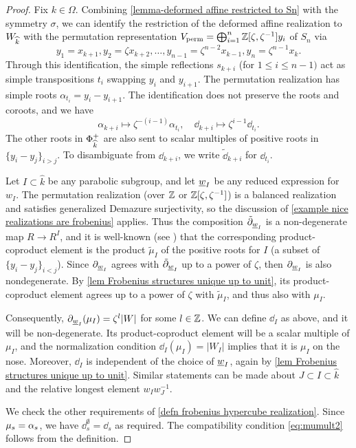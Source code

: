\begin{proof} 
Fix $k \in \Omega$. Combining \cref{lemma-deformed affine restricted to Sn} with the symmetry $\sigma$, we can identify the restriction of the deformed affine realization to $W_{\widehat{k}}$ with the permutation representation  $V_{\operatorname{perm}}=\bigoplus_{i=1}^n \mathbb{Z}[\zeta,\zeta^{-1}] y_i$ of $S_n$ via 
\begin{equation}\label{eq identifying deformed affine restricted to W-k-hat with permutation}
y_1=x_{k+1}, y_2=\zeta x_{k+2}, \ldots ,y_{n-1}=\zeta^{n-2} x_{k-1}, y_n=\zeta^{n-1} x_k.     
\end{equation}
Through this identification, the simple reflections $s_{k+i}$ (for $1 \leq i \leq n-1)$ act as simple transpositions $t_i$ swapping $y_i$ and $y_{i+1}$.
The permutation realization has simple roots $\alpha_{t_i} = y_i-y_{i+1}$. The identification does not preserve the roots and coroots, and we have
\begin{equation} \alpha_{k+i} \mapsto \zeta^{-(i-1)} \alpha_{t_i}, \quad \dd_{k+i} \mapsto \zeta^{i-1} \dd_{t_i}. \end{equation}
The other roots in $\Phi^+_{\widehat{k}}$ are also sent to scalar multiples of positive roots in $\{y_i - y_j\}_{i > j}$. To disambiguate from $\dd_{k+i}$, we write $\tilde{\dd}_{k+i}$ for $\dd_{t_i}$.

Let $I \subset \hat{k}$ be any parabolic subgroup, and let $\underline{w}_I$ be any reduced expression for $w_I$. The permutation realization (over $\mathbb{Z}$ or $\mathbb{Z}[\zeta, \zeta^{-1}]$) is a balanced realization and satisfies generalized Demazure surjectivity, so the discussion of \cref{example nice realizations are frobenius} applies. Thus the composition $\tilde{\partial}_{\underline{w}_I}$ is a non-degenerate map $R \to R^I$, and it is well-known (see \cite{Demazure}) that the corresponding product-coproduct element is the product $\tilde{\mu}_I$ of the positive roots for $I$ (a subset of $\{y_i - y_j\}_{i < j}$). Since $\partial_{\underline{w}_I}$ agrees with $\tilde{\partial}_{\underline{w}_I}$ up to a power of $\zeta$, then $\partial_{\underline{w}_I}$ is also nondegenerate. By \cref{lem Frobenius structures unique up to unit}, its product-coproduct element agrees up to a power of $\zeta$ with $\tilde{\mu}_I$, and thus also with $\mu_I$.

Consequently, $\partial_{\underline{w}_I}(\mu_I) = \zeta^l |W|$ for some $l \in \mathbb{Z}$. We can define $\dd_I$ as above, and it will be non-degenerate. Its product-coproduct element will be a scalar multiple of $\mu_I$, and the normalization condition $\dd_I(\mu_I) = |W_I|$ implies that it is $\mu_I$ on the nose. Moreover, $\dd_I$ is independent of the choice of $\underline{w}_I$, again by \cref{lem Frobenius structures unique up to unit}. Similar statements can be made about $J \subset I \subset \hat{k}$ and the relative longest element $w_Iw_J^{-1}$.

We check the other requirements of \cref{defn frobenius hypercube realization}. Since $\mu_s = \alpha_s$, we have  $\dd^{\emptyset}_s =\dd_s$ as required. The compatibility condition \eqref{eq:mumult2} follows from the definition. \end{proof}

